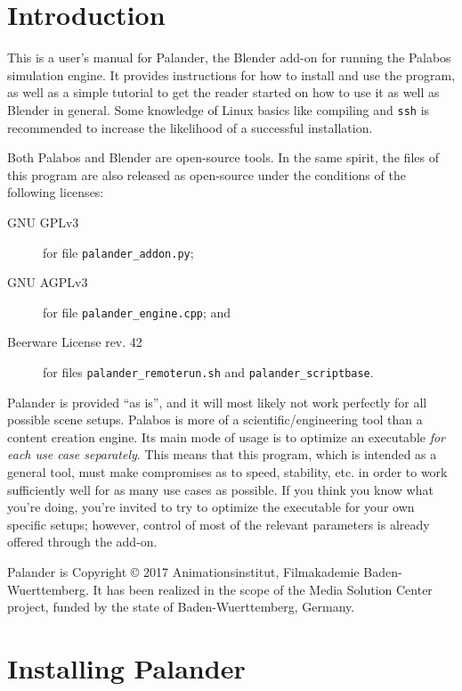 \documentclass[12pt]{article}
\begin{document}
\section{Introduction}

This is a user's manual for Palander, the Blender add-on for running the Palabos simulation engine. It 
provides instructions for how to install and use the program, as well as a simple tutorial to get the reader 
started on how to use it as well as Blender in general. Some knowledge of Linux basics like compiling and 
\verb|ssh| is recommended to increase the likelihood of a successful installation.

Both Palabos and Blender are open-source tools. In the same spirit, the files of this program are also 
released as open-source under the conditions of the following licenses:
\begin{description}
\item[GNU GPLv3] for file \verb|palander_addon.py|;
\item[GNU AGPLv3] for file \verb|palander_engine.cpp|; and
\item[Beerware License rev. 42] for files \verb|palander_remoterun.sh| and \verb|palander_scriptbase|.
\end{description}

Palander is provided ``as is'', and it will most likely not work perfectly for all possible scene setups. 
Palabos is more of a scientific/engineering tool than a content creation engine. Its main mode of usage is to 
optimize an executable \emph{for each use case separately}. This means that this program, which is intended 
as a general tool, must make compromises as to speed, stability, etc. in order to work sufficiently well for 
as many use cases as possible. If you think you know what you're doing, you're invited to try to optimize the 
executable for your own specific setups; however, control of most of the relevant parameters is already 
offered through the add-on.

Palander is Copyright \copyright{} 2017 Animationsinstitut, Filmakademie Baden-Wuerttemberg. It has been 
realized in the scope of the Media Solution Center project, funded by the state of Baden-Wuerttemberg, 
Germany.

\newpage

\section{Installing Palander}
\end{document}
